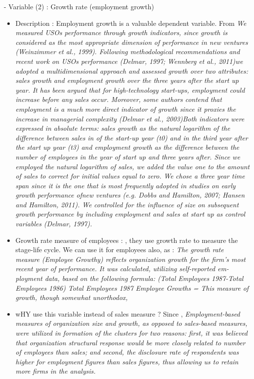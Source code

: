 \begin{itemize}
\begin{itemize}
- Variable (2) : Growth rate (employment growth)
\begin{itemize}
  \item Description : Employment growth is a valuable dependent variable. From \citep{visintin2014founding} \textit{We measured USOs performance through growth indicators, since growth is considered as the most appropriate dimension of performance in new ventures (Weinzimmer et al., 1999). Following methodological recommendations and recent work on USOs performance (Delmar, 1997; Wennberg et al., 2011)we adopted a multidimensional approach and assessed growth over two attributes: sales growth and employment growth over the three years after the start up year. It has been argued that for high-technology start-ups, employment could increase before any sales occur. Moreover, some authors contend that employment is a much more direct indicator of growth since it proxies the increase in managerial complexity (Delmar et al., 2003)Both indicators were expressed in absolute terms: sales growth as the natural logarithm of the difference between sales in of the start-up year (t0) and in the third year after the start up year (t3) and employment growth as the difference between the number of employees in the year of start up and three years after. Since we employed the natural logarithm of sales, we added the value one to the amount of sales to correct for initial values equal to zero. We chose a three year time span since it is the one that is most frequently adopted in studies on early growth performance ofnew ventures (e.g. Dobbs and Hamilton, 2007; Hansen and Hamilton, 2011). We controlled for the influence of size on subsequent growth performance by including employment and sales at start up as control variables (Delmar, 1997).}
  \item Growth rate measure of employees : \citet{hanks1994tightening}, they use growth rate to measure the stage-life cycle. We can use it for employees also, as : \textit{The growth rate measure (Employee Growthy) reflects organization growth for the firm's most recent year of performance. It was calculated, utilizing self-reported em-ployment data, based on the following formula: (Total Employees 1987-Total Employees 1986) Total Employees 1987 Employee Growths = This measure of growth, though somewhat unorthodox,}
  \item wHY use this variable instead of sales measure ? Since \citet{hanks1994tightening}, \textit{Employment-based measures of organization size and growth, as opposed to sales-based measures, were utilized in formation of the clusters for two reasons: first, it was believed that organization structural response would be more closely related to number of employees than sales; and second, the disclosure rate of respondents was higher for employment figures than sales figures, thus allowing us to retain more firms in the analysis.}

\end{itemize}
\end{itemize}
\end{itemize}
